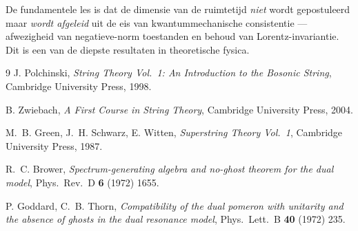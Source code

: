 \documentclass[12pt,a4paper]{article}
\begin{document}
De fundamentele les is dat de dimensie van de ruimtetijd \emph{niet} wordt gepostuleerd maar \emph{wordt afgeleid} uit de eis van kwantummechanische consistentie --- afwezigheid van negatieve-norm toestanden en behoud van Lorentz-invariantie. Dit is een van de diepste resultaten in theoretische fysica.

\begin{thebibliography}{9}
J. Polchinski, \textit{String Theory Vol.\ 1: An Introduction to the Bosonic String}, Cambridge University Press, 1998.

B. Zwiebach, \textit{A First Course in String Theory}, Cambridge University Press, 2004.

M.~B. Green, J.~H. Schwarz, E. Witten, \textit{Superstring Theory Vol.\ 1}, Cambridge University Press, 1987.

R.~C. Brower, \textit{Spectrum-generating algebra and no-ghost theorem for the dual model}, Phys.\ Rev.\ D \textbf{6} (1972) 1655.

P. Goddard, C.~B. Thorn, \textit{Compatibility of the dual pomeron with unitarity and the absence of ghosts in the dual resonance model}, Phys.\ Lett.\ B \textbf{40} (1972) 235.
\end{thebibliography}
\end{document}
